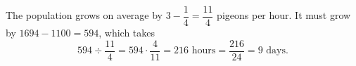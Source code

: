 The population grows on average by $3-\dfrac{1}{4}=\dfrac{11}{4}$ pigeons per hour. It must grow by $1694-1100=594$, which takes
\[594\div\dfrac{11}{4}=594\cdot\dfrac{4}{11}=216\text{ hours}=\dfrac{216}{24}=\boxed{9}\text{ days}.\]
